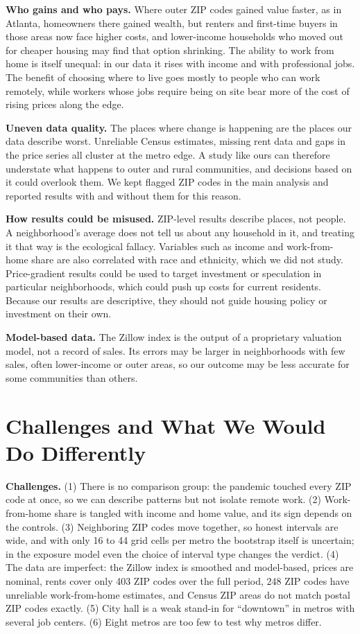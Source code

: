 \documentclass[11pt]{article}
\begin{document}
\textbf{Who gains and who pays.} Where outer ZIP codes gained value faster, as in Atlanta, homeowners there gained wealth, but renters and
first-time buyers in those areas now face higher costs, and lower-income households who moved out for cheaper housing may find that option
shrinking. The ability to work from home is itself unequal: in our data it rises with income and with professional jobs. The benefit of
choosing where to live goes mostly to people who can work remotely, while workers whose jobs require being on site bear more of the cost of
rising prices along the edge.

\textbf{Uneven data quality.} The places where change is happening are the places our data describe worst. Unreliable Census estimates,
missing rent data and gaps in the price series all cluster at the metro edge. A study like ours can therefore understate what happens to
outer and rural communities, and decisions based on it could overlook them. We kept flagged ZIP codes in the main analysis and reported
results with and without them for this reason.

\textbf{How results could be misused.} ZIP-level results describe places, not people. A neighborhood's average does not tell us about any
household in it, and treating it that way is the ecological fallacy. Variables such as income and work-from-home share are also correlated
with race and ethnicity, which we did not study. Price-gradient results could be used to target investment or speculation in particular
neighborhoods, which could push up costs for current residents. Because our results are descriptive, they should not guide housing policy
or investment on their own.

\textbf{Model-based data.} The Zillow index is the output of a proprietary valuation model, not a record of sales. Its errors may be larger in
neighborhoods with few sales, often lower-income or outer areas, so our outcome may be less accurate for some communities than others.

\section{Challenges and What We Would Do Differently}

\textbf{Challenges.} (1) There is no comparison group: the pandemic touched every ZIP code at once, so we can describe patterns but not
isolate remote work. (2) Work-from-home share is tangled with income and home value, and its sign depends on the controls. (3) Neighboring ZIP
codes move together, so honest intervals are wide, and with only 16 to 44 grid cells per metro the bootstrap itself is uncertain; in the exposure
model even the choice of interval type changes the verdict. (4) The data are imperfect: the Zillow index is smoothed and model-based, prices are
nominal, rents cover only 403 ZIP codes over the full period, 248 ZIP codes have unreliable work-from-home estimates, and Census ZIP areas do not
match postal ZIP codes exactly. (5) City hall is a weak stand-in for ``downtown'' in metros with several job centers. (6) Eight metros are too few
to test why metros differ.
\end{document}
